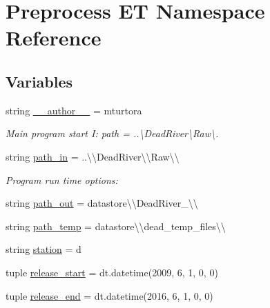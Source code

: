 \hypertarget{namespace_preprocess_01_e_t}{}\section{Preprocess E\+T Namespace Reference}
\label{namespace_preprocess_01_e_t}
\subsection*{Variables}
\begin{DoxyCompactItemize}
\item 
string \hyperlink{namespace_preprocess_01_e_t_af567d53c78b91e20299e248e7406204c}{\+\_\+\+\_\+author\+\_\+\+\_\+} = \textquotesingle{}mturtora\textquotesingle{}
\begin{DoxyCompactList}\small\item\em Main program start I\+: path = \textquotesingle{}..\textbackslash{}Dead\+River\textbackslash{}Raw\textbackslash{}\textquotesingle{}. \end{DoxyCompactList}\item 
string \hyperlink{namespace_preprocess_01_e_t_a151a3a834613bb2467aeccb10f940ef1}{path\+\_\+in} = \textquotesingle{}..\textbackslash{}\textbackslash{}Dead\+River\textbackslash{}\textbackslash{}\+Raw\textbackslash{}\textbackslash{}\textquotesingle{}
\begin{DoxyCompactList}\small\item\em Program run time options\+: \end{DoxyCompactList}\item 
string \hyperlink{namespace_preprocess_01_e_t_aa8c626406a6808516d849d8b130cd865}{path\+\_\+out} = \textquotesingle{}datastore\textbackslash{}\textbackslash{}\+Dead\+River\+\_\textbackslash{}\textbackslash{}\textquotesingle{}
\item 
string \hyperlink{namespace_preprocess_01_e_t_ad821e7ccf289a1b4a0bbb7f2657bd817}{path\+\_\+temp} = \textquotesingle{}datastore\textbackslash{}\textbackslash{}dead\+\_\+temp\+\_\+files\textbackslash{}\textbackslash{}\textquotesingle{}
\item 
string \hyperlink{namespace_preprocess_01_e_t_ae4f8823553a121082c4f553685d82cc3}{station} = \textquotesingle{}d\textquotesingle{}
\item 
tuple \hyperlink{namespace_preprocess_01_e_t_ab39b88edc6dd3541bec4573f18c49552}{release\+\_\+start} = dt.\+datetime(2009, 6, 1, 0, 0)
\item 
tuple \hyperlink{namespace_preprocess_01_e_t_a2f7d541b022d9fd150e158ebb8b34ae1}{release\+\_\+end} = dt.\+datetime(2016, 6, 1, 0, 0)

\end{DoxyCompactItemize}
